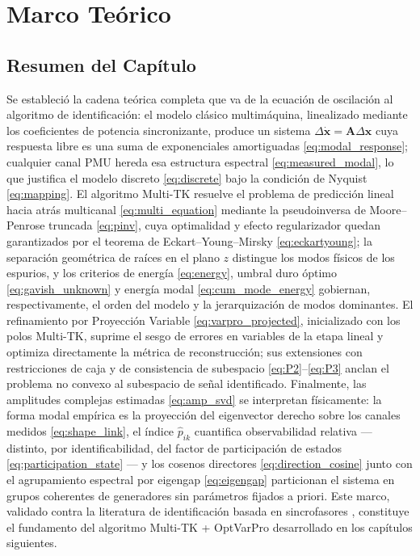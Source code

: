 
\chapter{Marco Teórico}

\section*{Resumen del Capítulo}

Se estableció la cadena teórica completa que va de la ecuación de
oscilación al algoritmo de identificación: el modelo clásico multimáquina,
linealizado mediante los coeficientes de potencia sincronizante, produce un
sistema $\Delta\dot{\mathbf{x}} = \mathbf{A}\Delta\mathbf{x}$ cuya
respuesta libre es una suma de exponenciales amortiguadas
\eqref{eq:modal_response}; cualquier canal PMU hereda esa estructura
espectral \eqref{eq:measured_modal}, lo que justifica el modelo discreto
\eqref{eq:discrete} bajo la condición de Nyquist \eqref{eq:mapping}. El
algoritmo Multi-TK resuelve el problema de predicción lineal hacia atrás
multicanal \eqref{eq:multi_equation} mediante la pseudoinversa de
Moore--Penrose truncada \eqref{eq:pinv}, cuya optimalidad y efecto
regularizador quedan garantizados por el teorema de Eckart--Young--Mirsky
\eqref{eq:eckartyoung}; la separación geométrica de raíces en el plano $z$
distingue los modos físicos de los espurios, y los criterios de energía
\eqref{eq:energy}, umbral duro óptimo \eqref{eq:gavish_unknown} y energía
modal \eqref{eq:cum_mode_energy} gobiernan, respectivamente, el orden del
modelo y la jerarquización de modos dominantes. El refinamiento por
Proyección Variable \eqref{eq:varpro_projected}, inicializado con los polos
Multi-TK, suprime el sesgo de errores en variables de la etapa lineal y
optimiza directamente la métrica de reconstrucción; sus extensiones con
restricciones de caja y de consistencia de subespacio
\eqref{eq:P2}--\eqref{eq:P3} anclan el problema no convexo al subespacio de
señal identificado. Finalmente, las amplitudes complejas estimadas
\eqref{eq:amp_svd} se interpretan físicamente: la forma modal empírica es la
proyección del eigenvector derecho sobre los canales medidos
\eqref{eq:shape_link}, el índice $\hat{p}_{ik}$ cuantifica observabilidad
relativa --- distinto, por identificabilidad, del factor de participación
de estados \eqref{eq:participation_state} --- y los cosenos directores
\eqref{eq:direction_cosine} junto con el agrupamiento espectral por
eigengap \eqref{eq:eigengap} particionan el sistema en grupos coherentes de
generadores sin parámetros fijados a priori. Este marco, validado contra la
literatura de identificación basada en sincrofasores
\cite{jiang2021,li2018cwt,li2020era}, constituye el fundamento del
algoritmo Multi-TK + OptVarPro desarrollado en los capítulos siguientes.


